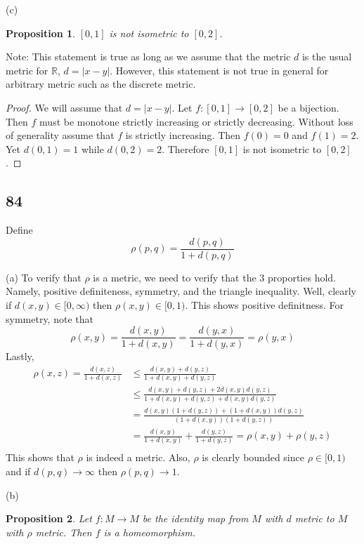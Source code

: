 \documentclass[11pt]{amsart}
\newtheorem*{prop}{Proposition}
\begin{document}
(c) 
\begin{prop}
  $[0,1]$ is not isometric to $[0,2]$.
\end{prop}

Note: This statement is true as long as we assume that the metric $d$ is the usual metric for $\mathbb{R}$, $d = |x-y|$. However, this statement is not true in general for arbitrary metric such as the discrete metric.

\begin{proof}
  We will assume that $d = |x-y|$. Let $f:[0,1] \longrightarrow [0,2]$ be a bijection. Then $f$ must be monotone strictly increasing or strictly decreasing. Without loss of generality assume that $f$ is strictly increasing. Then $f(0) = 0$ and $f(1) = 2$. Yet $d(0,1) = 1$ while $d(0,2) = 2$. Therefore $[0,1]$ is not isometric to $[0,2]$.
\end{proof}



\subsection*{84} Define 
\[ \rho(p,q) = \frac{d(p,q)}{1 + d(p,q)} \]

(a) To verify that $\rho$ is a metric, we need to verify that the 3 proporties hold. Namely, positive definiteness, symmetry, and the triangle inequality. Well, clearly if $d(x,y) \in [0,\infty)$ then $\rho(x,y) \in [0,1)$. This shows positive definitness. For symmetry, note that 
\[ \rho(x,y) = \frac{d(x,y)}{1+d(x,y)} = \frac{d(y,x)}{1+d(y,x)} = \rho(y,x) \]
Lastly,
\begin{align*}
  \rho(x,z) = \frac{d(x,z)}{1+d(x,z)} & \leq \frac{d(x,y) + d(y,z)}{1 + d(x,y) + d(y,z)} \\
  & \leq \frac{d(x,y) + d(y,z) + 2d(x,y)d(y,z)}{1 + d(x,y) + d(y,z) + d(x,y)d(y,z)} \\
  & = \frac{d(x,y)(1 + d(y,z)) + (1 + d(x,y))d(y,z)}{(1 + d(x,y))(1 + d(y,z))} \\
  & = \frac{d(x,y)}{1 + d(x,y)} + \frac{d(y,z)}{1 + d(y,z)} = \rho(x,y) + \rho(y,z) \\ 
\end{align*}
This shows that $\rho$ is indeed a metric. Also, $\rho$ is clearly bounded since $\rho \in [0,1)$ and if $d(p,q) \longrightarrow \infty$ then $\rho(p,q) \longrightarrow 1$. 

(b) 
\begin{prop}
  Let $f: M\longrightarrow M$ be the identity map from $M$ with $d$ metric to $M$ with $\rho$ metric. Then $f$ is a homeomorphism.
\end{prop}
\end{document}
